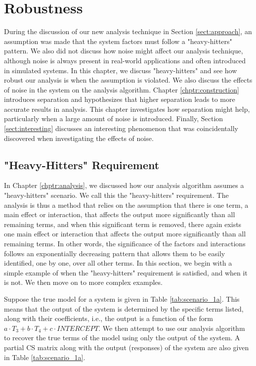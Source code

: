 \chapter{Robustness} \label{chptr:robustness}

During the discussion of our new analysis technique in Section \ref{sect:approach}, an assumption was made that the system factors must follow a "heavy-hitters" pattern.
We also did not discuss how noise might affect our analysis technique, although noise is always present in real-world applications and often introduced in simulated systems.
In this chapter, we discuss "heavy-hitters" and see how robust our analysis is when the assumption is violated.
We also discuss the effects of noise in the system on the analysis algorithm.
Chapter \ref{chptr:construction} introduces separation and hypothesizes that higher separation leads to more accurate results in analysis.
This chapter investigates how separation might help, particularly when a large amount of noise is introduced.
Finally, Section \ref{sect:interesting} discusses an interesting phenomenon that was coincidentally discovered when investigating the effects of noise.

\section{"Heavy-Hitters" Requirement} \label{sect:heavyhitters}

In Chapter \ref{chptr:analysis}, we discussed how our analysis algorithm assumes a "heavy-hitters" scenario.
We call this the "heavy-hitters" requirement.
The analysis is thus a method that relies on the assumption that there is one term, a main effect or interaction, that affects the output more significantly than all remaining terms, and when this significant term is removed, there again exists one main effect or interaction that affects the output more significantly than all remaining terms.
In other words, the significance of the factors and interactions follows an exponentially decreasing pattern that allows them to be easily identified, one by one, over all other terms.
In this section, we begin with a simple example of when the "heavy-hitters" requirement is satisfied, and when it is not.
We then move on to more complex examples.

Suppose the true model for a system is given in Table \ref{tab:scenario_1a}.
This means that the output of the system is determined by the specific terms listed, along with their coefficients, i.e., the output is a function of the form $a \cdot T_{3} + b \cdot T_{4} + c \cdot \mathit{INTERCEPT}$.
We then attempt to use our analysis algorithm to recover the true terms of the model using only the output of the system.
A partial CS matrix along with the output (responses) of the system are also given in Table \ref{tab:scenario_1a}.

